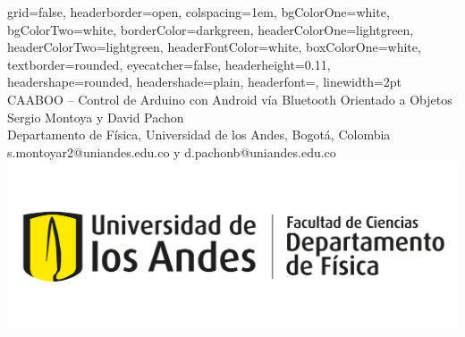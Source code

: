 \documentclass[a0paper,portrait]{baposter}
\begin{document}

\begin{poster}
{
grid=false,
headerborder=open, %
colspacing=1em, %
bgColorOne=white, %
bgColorTwo=white, %
borderColor=darkgreen, %
headerColorOne=lightgreen, %
headerColorTwo=lightgreen, %
headerFontColor=white, %
boxColorOne=white, %
textborder=rounded, %
eyecatcher=false, %
headerheight=0.11\textheight, %
headershape=rounded, %
headershade=plain,
headerfont=\Large\textsf, %
linewidth=2pt %
}
{}
%
%
{
\textsf %
{CAABOO -- Control de Arduino con Android vía Bluetooth Orientado a Objetos
}
} %
{\sf\vspace{0.0em}\\
Sergio Montoya y David Pachon
\vspace{0.1em}\\
\small{Departamento de Física, Universidad de los Andes, Bogotá, Colombia
\vspace{0.2em}\\
s.montoyar2@uniandes.edu.co y d.pachonb@uniandes.edu.co}
}
{\includegraphics[scale=0.25]{logofisi.png}} %



\end{poster}
\end{document}
